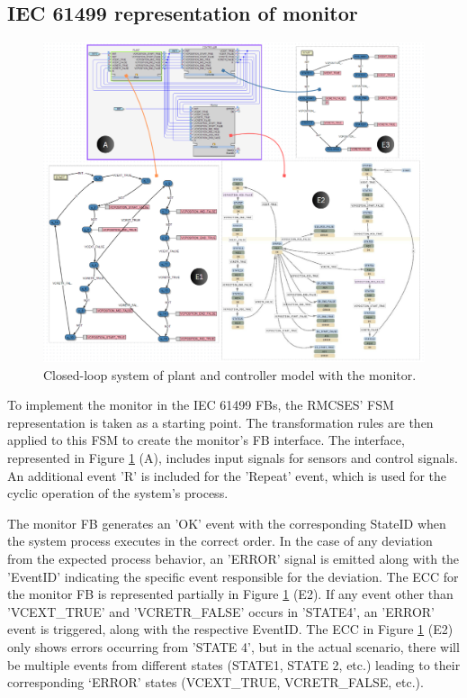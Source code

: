 \begin{bibunit}
\subsection{IEC 61499 representation of monitor}


\begin{figure}[!t]
	\centering
	\includegraphics[width=1\textwidth]{MX_Papers/Paper7/images/CLMC.PNG}
	\caption{Closed-loop system of plant and controller model with the monitor.}
	\label{CL_plant_controller_monitor}
\end{figure}


To implement the monitor in the IEC 61499 FBs, the RMCSES' FSM representation is taken as a starting point. The transformation rules are then applied to this FSM to create the monitor's FB interface. The interface, represented in Figure \ref{CL_plant_controller_monitor} (A), includes input signals for sensors and control signals. An additional event 'R' is included for the 'Repeat' event, which is used for the cyclic operation of the system's process.


The monitor FB generates an 'OK' event with the corresponding StateID when the system process executes in the correct order. In the case of any deviation from the expected process behavior, an 'ERROR' signal is emitted along with the 'EventID' indicating the specific event responsible for the deviation. The ECC for the monitor FB is represented partially in Figure \ref{CL_plant_controller_monitor} (E2). If any event other than 'VCEXT\_TRUE' and 'VCRETR\_FALSE' occurs in 'STATE4', an 'ERROR' event is triggered, along with the respective EventID. The ECC in Figure \ref{CL_plant_controller_monitor} (E2) only shows errors occurring from 'STATE 4', but in the actual scenario, there will be multiple events from different states (STATE1, STATE 2, etc.) leading to their corresponding ‘ERROR’ states (VCEXT\_TRUE, VCRETR\_FALSE, etc.).



\end{bibunit}
